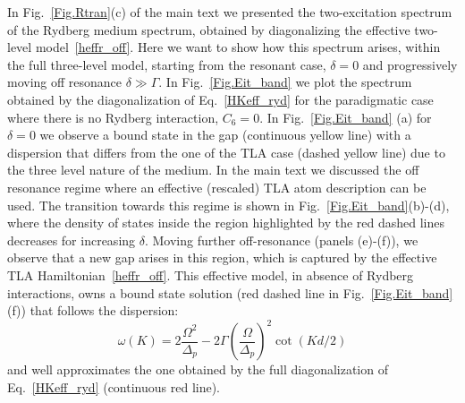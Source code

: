 \documentclass[pra,twocolumn,showpacs,preprintnumbers,amsmath,amssymb]{revtex4-1}
\begin{document}
In Fig.~\ref{Fig.Rtran}(c) of the main text we presented the two-excitation spectrum of the Rydberg medium spectrum, obtained by diagonalizing the effective two-level model~\eqref{heffr_off}. Here we want to show how this spectrum arises, within the full three-level model, starting from the resonant case, $\delta=0$ and  progressively moving off resonance $\delta\gg \Gamma$. In Fig.~\ref{Fig.Eit_band} we plot the spectrum obtained by the diagonalization of Eq.~\eqref{HKeff_ryd} for the paradigmatic case where there is no Rydberg interaction, $C_6=0$.  In Fig.~\ref{Fig.Eit_band} (a) for $\delta=0$ we observe a bound state in the gap (continuous yellow line) with a dispersion that differs from the one of the TLA case (dashed yellow line) due to the three level nature of the medium. 
In the main text we discussed the off resonance regime where an effective (rescaled) TLA atom description can be used. The transition towards this regime is shown in  Fig.~\ref{Fig.Eit_band}(b)-(d), where the density of states inside the region highlighted by the red dashed lines decreases for increasing $\delta$.
Moving further off-resonance (panels (e)-(f)), we observe that a new gap arises in this region, which is captured by the effective TLA Hamiltonian~\eqref{heffr_off}.
This effective model, in absence of Rydberg interactions, owns a bound state solution (red dashed line in  Fig.~\ref{Fig.Eit_band} (f)) that follows the dispersion:
\begin{equation}\label{dis_EIT_BS}
\omega(K)=2\frac{\Omega^2}{\Delta_p}-2\Gamma\left(\frac{\Omega}{\Delta_p}\right)^2\cot(Kd/2)
\end{equation}
and well approximates the one obtained by the full diagonalization of  Eq.~\eqref{HKeff_ryd} (continuous red line).
 


\end{document}
